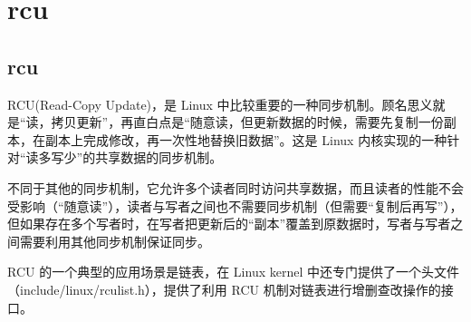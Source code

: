 \documentclass[12pt,a4paper,openany,fleqn]{book} %
\begin{document}
  
\tableofcontents

%
%
%
\chapter{rcu}
\section{rcu}
RCU(Read-Copy Update)，是 Linux 中比较重要的一种同步机制。顾名思义就是“读，拷贝更新”，再直白点是“随意读，但更新数据的时候，需要先复制一份副本，在副本上完成修改，再一次性地替换旧数据”。这是 Linux 内核实现的一种针对“读多写少”的共享数据的同步机制。

不同于其他的同步机制，它允许多个读者同时访问共享数据，而且读者的性能不会受影响（“随意读”），读者与写者之间也不需要同步机制（但需要“复制后再写”），但如果存在多个写者时，在写者把更新后的“副本”覆盖到原数据时，写者与写者之间需要利用其他同步机制保证同步。

RCU 的一个典型的应用场景是链表，在 Linux kernel 中还专门提供了一个头文件（include/linux/rculist.h），提供了利用 RCU 机制对链表进行增删查改操作的接口。
\end{document}

